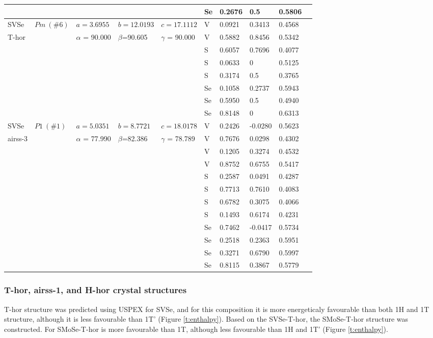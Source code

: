 \documentclass[a4paperm]{article}
\begin{document}
\begin{table}[H]
\begin{tabular}{l*{9}{l}}
		&&&&& Se	&	0.2676	&	0.5	&	0.5806	\\
		\hline
		SVSe & $Pm\ (\#6)$  &	$a=3.6955$ & $b=12.0193$ & $c=17.1112$  & V	&	0.0921	&	0.3413	&	0.4568	\\
		T-hor&&$\alpha$ = 90.000& $\beta$=90.605& $\gamma$ = 90.000& V	&	0.5882	&	0.8456	&	0.5342	\\
		&&&&&	S	&	0.6057	&	0.7696	&	0.4077	\\
		&&&&&	S	&	0.0633	&	0		&	0.5125	\\
		&&&&&	S	&	0.3174	&	0.5		&	0.3765	\\
		&&&&&	Se	&	0.1058	&	0.2737	&	0.5943	\\
		&&&&&	Se	&	0.5950	&	0.5		&	0.4940	\\
		&&&&&	Se	&	0.8148	&	0		&	0.6313	\\
		\hline
		SVSe & $P1\ (\#1)$  &	$a=5.0351$ & $b=8.7721$ & $c=18.0178$  & V	&	0.2426	&	-0.0280	&	0.5623	\\
		airss-3&&$\alpha$ = 77.990& $\beta$=82.386& $\gamma$ = 78.789  & V	&	0.7676	&	0.0298	&	0.4302	\\		
		&&&&&	V	&	0.1205	&	0.3274	&	0.4532	\\
		&&&&&	V	&	0.8752	&	0.6755	&	0.5417	\\
		&&&&&	S	&	0.2587	&	0.0491	&	0.4287	\\
		&&&&&	S	&	0.7713	&	0.7610	&	0.4083	\\
		&&&&&	S	&	0.6782	&	0.3075	&	0.4066	\\
		&&&&&	S	&	0.1493	&	0.6174	&	0.4231	\\
		&&&&&	Se	&	0.7462	&	-0.0417	&	0.5734	\\
		&&&&&	Se	&	0.2518	&	0.2363	&	0.5951	\\
		&&&&&	Se	&	0.3271	&	0.6790	&	0.5997	\\
		&&&&&	Se	&	0.8115	&	0.3867	&	0.5779	\\
		\hline
	\end{tabular}
\end{table}


\subsubsection{T-hor, airss-1, and H-hor crystal structures}
T-hor structure was predicted using USPEX for SVSe, and for this composition it is more  energeticaly favourable than both 1H and 1T structure, although it is less favourable than 1T' (Figure \ref{t:enthalpy}).
Based on the SVSe-T-hor, the SMoSe-T-hor structure was constructed.
For SMoSe-T-hor is more favourable than 1T, although less favourable than 1H and 1T' (Figure \ref{t:enthalpy}).
\end{document}
